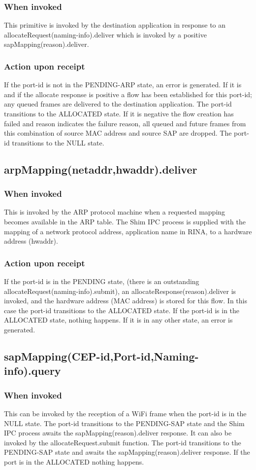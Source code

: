 \subsubsection{When invoked}
This primitive is invoked by the destination application in response to an allocateRequest(naming-info).deliver which is invoked by a positive sapMapping(reason).deliver.
\subsubsection{Action upon receipt}
If the port-id is not in the PENDING-ARP state, an error is generated. If it is and if the allocate response is positive a flow has been established for this port-id; any queued frames are delivered to the destination application. The port-id transitions to the ALLOCATED state. If it is negative the flow creation has failed and reason indicates the failure reason, all queued and future frames from this combination of source MAC address and source SAP are dropped. The port-id transitions to the NULL state.


\subsection{arpMapping(netaddr,hwaddr).deliver}
\subsubsection{When invoked}
This is invoked by the ARP protocol machine when a requested mapping becomes available in the ARP table. The Shim IPC process is supplied with the mapping of a network protocol address, application name in RINA, to a hardware address (hwaddr).
\subsubsection{Action upon receipt}
If the port-id is in the PENDING state, (there is an outstanding allocateRequest(naming-info).submit), an allocateResponse(reason).deliver is invoked, and the hardware address (MAC address) is stored for this flow.  In this case the port-id transitions to the ALLOCATED state. If the port-id is in the ALLOCATED state, nothing happens. If it is in any other state, an error is generated.

\subsection{sapMapping(CEP-id,Port-id,Naming-info).query}
\subsubsection{When invoked}
This can be invoked by the reception of a WiFi frame when the port-id is in the NULL state. The port-id transitions to the PENDING-SAP state and the Shim IPC process awaits the sapMapping(reason).deliver response. It can also be invoked by the allocateRequest.submit function. The port-id transitions to the PENDING-SAP state and awaits the sapMapping(reason).deliver response. If the port is in the ALLOCATED nothing happens.
